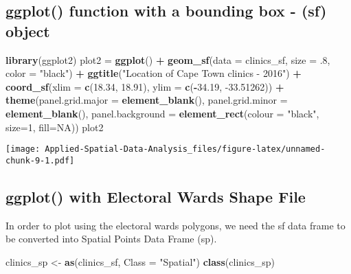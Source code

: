 \documentclass[
]{book}
\newenvironment{Shaded}{\begin{snugshade}}{\end{snugshade}}
\newcommand{\DataTypeTok}[1]{\textcolor[rgb]{0.13,0.29,0.53}{#1}}
\newcommand{\DecValTok}[1]{\textcolor[rgb]{0.00,0.00,0.81}{#1}}
\newcommand{\FloatTok}[1]{\textcolor[rgb]{0.00,0.00,0.81}{#1}}
\newcommand{\KeywordTok}[1]{\textcolor[rgb]{0.13,0.29,0.53}{\textbf{#1}}}
\newcommand{\NormalTok}[1]{#1}
\newcommand{\OperatorTok}[1]{\textcolor[rgb]{0.81,0.36,0.00}{\textbf{#1}}}
\newcommand{\OtherTok}[1]{\textcolor[rgb]{0.56,0.35,0.01}{#1}}
\newcommand{\StringTok}[1]{\textcolor[rgb]{0.31,0.60,0.02}{#1}}
\begin{document}
\hypertarget{ggplot-function-with-a-bounding-box---sf-object}{%
\subsection{ggplot() function with a bounding box - (sf) object}\label{ggplot-function-with-a-bounding-box---sf-object}}

\begin{Shaded}
\begin{Highlighting}[]
\KeywordTok{library}\NormalTok{(ggplot2)}
\NormalTok{plot2 =}\StringTok{ }\KeywordTok{ggplot}\NormalTok{() }\OperatorTok{+}\StringTok{ }
\StringTok{  }\KeywordTok{geom_sf}\NormalTok{(}\DataTypeTok{data =}\NormalTok{ clinics_sf, }\DataTypeTok{size =} \FloatTok{.8}\NormalTok{, }\DataTypeTok{color =} \StringTok{"black"}\NormalTok{) }\OperatorTok{+}\StringTok{ }
\StringTok{  }\KeywordTok{ggtitle}\NormalTok{(}\StringTok{"Location of Cape Town clinics - 2016"}\NormalTok{) }\OperatorTok{+}\StringTok{ }
\StringTok{  }\KeywordTok{coord_sf}\NormalTok{(}\DataTypeTok{xlim =} \KeywordTok{c}\NormalTok{(}\FloatTok{18.34}\NormalTok{, }\FloatTok{18.91}\NormalTok{), }\DataTypeTok{ylim =} \KeywordTok{c}\NormalTok{(}\OperatorTok{-}\FloatTok{34.19}\NormalTok{, }\FloatTok{-33.51262}\NormalTok{)) }\OperatorTok{+}
\StringTok{  }\KeywordTok{theme}\NormalTok{(}\DataTypeTok{panel.grid.major =} \KeywordTok{element_blank}\NormalTok{(), }
        \DataTypeTok{panel.grid.minor =} \KeywordTok{element_blank}\NormalTok{(),}
        \DataTypeTok{panel.background =} \KeywordTok{element_rect}\NormalTok{(}\DataTypeTok{colour =} \StringTok{"black"}\NormalTok{, }\DataTypeTok{size=}\DecValTok{1}\NormalTok{, }\DataTypeTok{fill=}\OtherTok{NA}\NormalTok{))}
\NormalTok{plot2}
\end{Highlighting}
\end{Shaded}

\texttt{[image: Applied-Spatial-Data-Analysis\_files/figure-latex/unnamed-chunk-9-1.pdf]}

\hypertarget{ggplot-with-electoral-wards-shape-file}{%
\subsection{ggplot() with Electoral Wards Shape File}\label{ggplot-with-electoral-wards-shape-file}}

In order to plot using the electoral wards polygons, we need the sf data frame to be converted into Spatial Points Data Frame (sp).

\begin{Shaded}
\begin{Highlighting}[]
\NormalTok{clinics_sp <-}\StringTok{ }\KeywordTok{as}\NormalTok{(clinics_sf, }\DataTypeTok{Class =} \StringTok{"Spatial"}\NormalTok{)}
\KeywordTok{class}\NormalTok{(clinics_sp)}
\end{Highlighting}
\end{Shaded}
\end{document}
